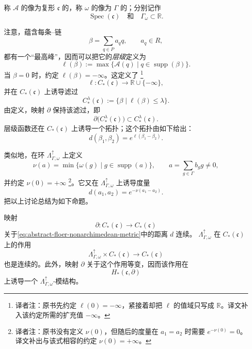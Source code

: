 称 $\mathcal A$ 的像为复形 $\mathfrak c$ 的\emph{\termActionSpectrum{}}，称 $\omega$
的像为 $\Gamma$ 的\emph{\termPeriodGroup{}}；分别记作
\[
  \operatorname{Spec}(\mathfrak c)
  \quad\text{和}\quad
  \Gamma_\omega\subset\mathbb R.
\]

注意，\termNovikovFinitenessCondition{}蕴含每条\personFloer{}--\personNovikov{}链
\[
  \beta=\sum_{q\in P}a_q q,
  \qquad a_q\in R,
\]
都有一个“最高峰”，因而可以把它的\emph{层级}定义为
\[
  \ell(\beta)
  :=\max\{\mathcal A(q)\mid q\in\operatorname{supp}(\beta)\}.
\]
当 $\beta=0$ 时，约定 $\ell(\beta)=-\infty$。这定义了\emph{\termLevelFunction{}}
\footnote{译者注：原书先约定 $\ell(0)=-\infty$，紧接着却把 $\ell$ 的值域只写成
$\mathbb R$。译文补入该约定所需的扩充值 $-\infty$。}
\[
  \ell:C_*(\mathfrak c)\longrightarrow
  \mathbb R\cup\{-\infty\},
\]
并在 $C_*(\mathfrak c)$ 上诱导滤过
\[
  C_*^\lambda(\mathfrak c)
  :=\{\beta\mid \ell(\beta)\leq\lambda\}.
\]
由定义，映射 $\partial$ 保持该滤过，即
\[
  \partial\bigl(C_*^\lambda(\mathfrak c)\bigr)
  \subset C_*^\lambda(\mathfrak c).
\]
层级函数还在 $C_*(\mathfrak c)$ 上诱导一个拓扑；这个拓扑由如下\termNonArchimedeanMetric{}给出：
\begin{equation}
  d(\beta_1,\beta_2)
  =e^{\ell(\beta_1-\beta_2)}.
\label{eq:abstract-floer-nonarchimedean-metric}
\end{equation}

类似地，在\personNovikov{}环 $\Lambda^\uparrow_{\Gamma,\omega}$ 上定义\emph{\termValuation{}}
\[
  \nu(a)
  =\min\{\omega(g)\mid g\in\operatorname{supp}(a)\},
  \qquad
  a=\sum_{g\in\Gamma}b_g g\ne0,
\]
并约定 $\nu(0)=+\infty$
\footnote{译者注：原书没有定义 $\nu(0)$，但随后的度量在 $a_1=a_2$ 时需要
$e^{-\nu(0)}=0$。译文补出与该式相容的约定 $\nu(0)=+\infty$。}。它又在
$\Lambda^\uparrow_{\Gamma,\omega}$ 上诱导度量
\[
  d(a_1,a_2)=e^{-\nu(a_1-a_2)}.
\]
把以上讨论总结为如下命题。

\begin{proposition}
\label{prop:abstract-floer-continuity-equivariance}
映射
\[
  \partial:C_*(\mathfrak c)\longrightarrow C_*(\mathfrak c)
\]
关于\eqref{eq:abstract-floer-nonarchimedean-metric}中的距离 $d$ 连续。
$\Lambda^\uparrow_{\Gamma,\omega}$ 在 $C_*(\mathfrak c)$ 上的作用
\[
  \Lambda^\uparrow_{\Gamma,\omega}\times C_*(\mathfrak c)
  \longrightarrow C_*(\mathfrak c)
\]
也是连续的。此外，映射 $\partial$ 关于这个作用等变，因而该作用在
\[
  H_*(\mathfrak c,\partial)
\]
上诱导一个 $\Lambda^\uparrow_{\Gamma,\omega}$-模结构。
\end{proposition}

